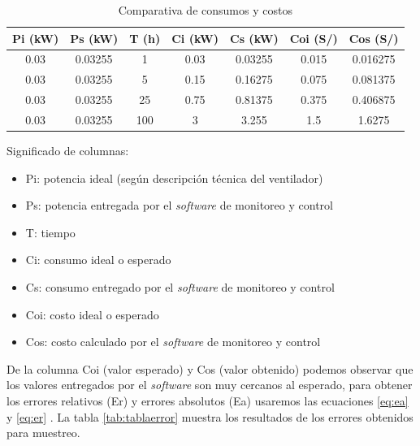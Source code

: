 \begin{table}[h]
	\centering
	\caption[Comparativa de consumos y costos]{Comparativa de consumos y costos}
	\begin{tabular}{c c c c c c c}    
		\toprule
		\textbf{Pi (kW)} 	 & \textbf{Ps (kW)}  & \textbf{T (h)} &\textbf{Ci (kW)} &\textbf{Cs (kW)} &\textbf{Coi (S/)} &\textbf{Cos (S/)}\\
		\midrule
		0.03 & 0.03255 & 1 & 0.03 & 0.03255 & 0.015 & 0.016275\\		
		0.03 & 0.03255 & 5 & 0.15 & 0.16275 & 0.075 & 0.081375 \\
		0.03 & 0.03255 & 25 & 0.75 & 0.81375 & 0.375 & 0.406875\\		
		0.03 & 0.03255 & 100 & 3 & 3.255 & 1.5 & 1.6275\\		
		
		\bottomrule
		\hline
	\end{tabular}
	\label{tab:tablacostos}
\end{table}

\vspace{0.1cm}
Significado de columnas:
\begin{itemize}
\item Pi: potencia ideal (según descripción técnica del ventilador) 
\item Ps: potencia entregada por el \emph{software} de monitoreo y control
\item T: tiempo
\item Ci: consumo ideal o esperado
\item Cs: consumo entregado por el \emph{software} de monitoreo y control
\item Coi: costo ideal o esperado
\item Cos: costo calculado por el \emph{software} de monitoreo y control
\end{itemize}

\vspace{0.1cm}
De la columna Coi (valor esperado) y Cos (valor obtenido) podemos observar que los valores entregados por el \emph{software} son muy cercanos al esperado, para obtener los errores relativos (Er) y errores absolutos (Ea) usaremos las ecuaciones  \ref{eq:ea} y \ref{eq:er} . La tabla \ref{tab:tablaerror} muestra los resultados de los errores obtenidos para muestreo.



